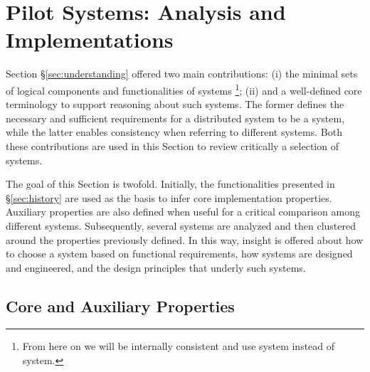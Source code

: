 \documentclass{sig-alternate}
\begin{document}
 



\section{Pilot Systems: Analysis and Implementations}
\label{sec:analysis}

Section \S\ref{sec:understanding} offered two main contributions: (i) the
minimal sets of logical components and functionalities of \pilot systems
\footnote{ From here on we will be internally consistent and use \pilot system
instead of \pilotjob system.}; (ii) and a well-defined core terminology to
support reasoning about such systems. The former defines the necessary and
sufficient requirements for a distributed system to be a \pilot system, while
the latter enables consistency when referring to different \pilot systems. Both
these contributions are used in this Section to review critically a selection
of \pilot systems.

The goal of this Section is twofold. Initially, the \pilot functionalities
presented in \S\ref{sec:history} are used as the basis to infer core \pilot
implementation properties. Auxiliary properties are also defined when useful
for a critical comparison among different \pilot systems. Subsequently, several
\pilot systems are analyzed and then clustered around the properties previously
defined. In this way, insight is offered about how to choose a \pilot system
based on functional requirements, how \pilot systems are designed and
engineered, and the design principles that underly such systems.

%
\subsection{Core and Auxiliary Properties}
\label{sec:properties}
\end{document}
